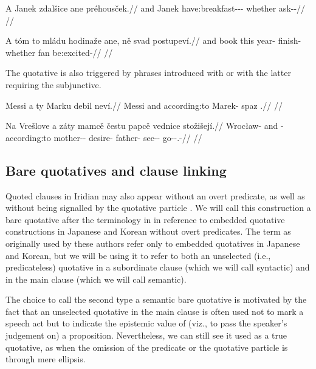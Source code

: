 \pex
\begingl
  \gla A Janek zdalšice ane préhousček.//
  \glb and Janek have:breakfast-\Av{}-\Pf{}-\Quot{} whether ask-\Av{}-\Pf{}//
  \glft {}//
\endgl
\xe

\pex
\begingl
  \gla A tóm to mládu hodinaže ane, ně svad postupev\'i.//
  \glb and book this year-\Ins{} finish- whether \Pl{} fan be:excited-//
  \glft {}//
\endgl
\xe

The quotative is also triggered by phrases introduced with  or  with the latter requiring the subjunctive. 


\pex
\begingl
  \gla Messi a ty Marku debil neví.//
  \glb Messi and according:to Marek-\Ins{} spaz \Cop{}.\Sbj{}//
  \glft {}//
\endgl
\xe

\pex
\begingl
  \gla Na Vrešlove a záty mamcě čestu papcě vednice stožišejí.//
  \glb \Loc{} Wrocław-\Acc{} and \Neg{}-according:to mother-\Dim{}-\Gen{} desire-\Ins{} father-\Gen{} see-\Pv{}-\SupP{} go-\Av{}-\Subj{}.\Pf{}-\Quot{}//
  \glft {}//
\endgl
\xe


\subsection{Bare quotatives and clause linking}

Quoted clauses in Iridian may also appear without an overt predicate, as well as without being signalled by the quotative particle . We will call this construction a {\sc bare quotative} after the terminology in \textcite{tomioka2019} in reference to embedded quotative constructions in Japanese and Korean without overt predicates. The term as originally used by these authors refer only to embedded quotatives in Japanese and Korean, but we will be using it to refer to both an unselected (i.e., predicateless) quotative in a subordinate clause (which we will call {\sc syntactic}) and in the main clause (which we will call {\sc semantic}).

The choice to call the second type a semantic bare quotative is motivated by the fact that an unselected quotative in the main clause is often used not to mark a speech act but to indicate the epistemic value of (viz., to pass the speaker's judgement on) a proposition. Nevertheless, we can still see it used as a true quotative, as when the omission of the predicate or the quotative particle is through mere ellipsis.

